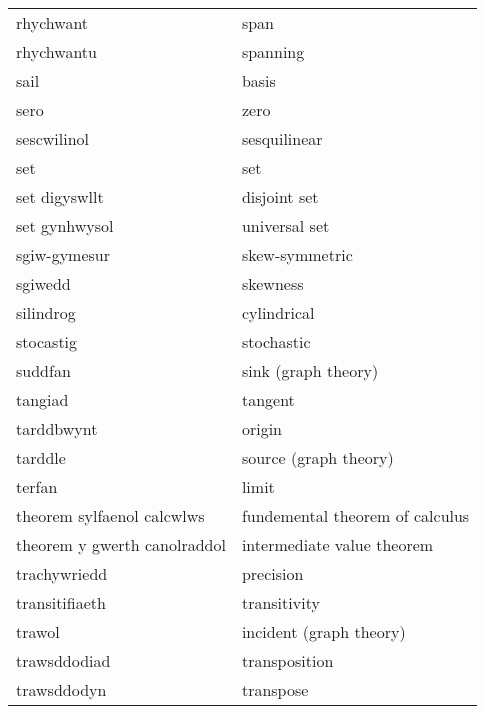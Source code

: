 \begin{supertabular}{p{0.22\textwidth}p{0.22\textwidth}}
                       rhychwant &                              span \\
                      rhychwantu &                          spanning \\
                            sail &                             basis \\
                            sero &                              zero \\
                     sescwilinol &                      sesquilinear \\
                             set &                               set \\
                   set digyswllt &                      disjoint set \\
                   set gynhwysol &                     universal set \\
                    sgiw-gymesur &                    skew-symmetric \\
                         sgiwedd &                          skewness \\
                       silindrog &                       cylindrical \\
                       stocastig &                        stochastic \\
                         suddfan &               sink (graph theory) \\
                         tangiad &                           tangent \\
                      tarddbwynt &                            origin \\
                         tarddle &             source (graph theory) \\
                          terfan &                             limit \\
      theorem sylfaenol calcwlws &   fundemental theorem of calculus \\
    theorem y gwerth canolraddol &        intermediate value theorem \\
                    trachywriedd &                         precision \\
                  transitifiaeth &                      transitivity \\
                          trawol &           incident (graph theory) \\
                    trawsddodiad &                     transposition \\
                     trawsddodyn &                         transpose \\

\end{supertabular}

